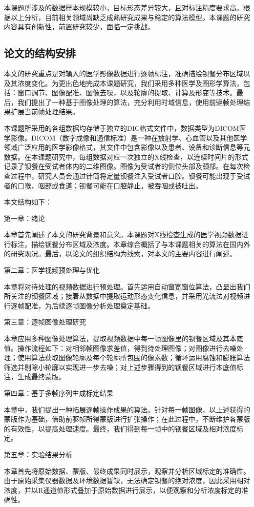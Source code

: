 本课题所涉及的数据样本规模较小，目标形态差异较大，且对标注精度要求高。根据以上分析，目前相关领域尚缺乏成熟研究成果与稳定的算法模型。本课题的研究内容具有创新性，前置研究较少，面临一定挑战。

\subsection{论文的结构安排}

本文的研究重点是对输入的医学影像数据进行逐帧标注，准确描绘钡餐分布区域以及其浓度变化。为更出色地完成本课题研究，我们采用多种医学及图形学算法，包括：窗口调节、图像配准、图像去噪，以及轮廓的提取、计算及形变等技术。最后，我们提出了一种基于图像处理的算法，充分利用时域信息，使用前驱帧处理结果扩展当前帧处理结果。

本课题所采用的各组数据均存储于独立的DIC格式文件中，数据类型为DICOM医学影像。DICOM（数字成像和通信标准）是一种在放射学、心血管以及其他医学领域广泛应用的医学影像格式，其文件中包含影像以及患者、设备和诊断信息等元数据。在本课题研究中，每组数据对应一次独立的X线检查，以连续时间片的形式记录了钡餐在受试者体内的二维图像。图像为受试者的侧位头部及颈部。在每次检查过程中，研究人员会通过针筒将定量钡餐注入受试者口腔。钡餐可能出现于受试者的口喉、咽部或食道；钡餐可能在口腔静止，被吞咽或被吐出。

本文结构如下：

第一章：绪论

本章首先阐述了本文的研究背景和意义。本课题对X线检查生成的医学视频数据进行标注，描绘钡餐分布区域及浓度。本章综合概括了与本课题相关的算法在国内外的研究现况。最后，以论文的组织结构为线索，对本文的主要内容进行阐述。

第二章：医学视频预处理与优化

本章将对待处理的视频数据进行预处理。首先运用自动窗宽窗位算法，凸显出我们所关注的钡餐区域；接着从数据中提取运动形态变化信息，并采用光流法对视频进行逐帧配准，为后续逐帧图像分析处理奠定基础。

第三章：逐帧图像处理研究

本章应用多种图像处理算法，提取视频数据中每一帧图像里的钡餐区域及其本底值。操作流程如下：对相邻帧图像求差值，得到待处理图像；对图像进行去噪处理；使用算法获取图像轮廓及每个轮廓所包围的像素数；循环运用腐蚀和膨胀算法筛选并剔除小轮廓以实现进一步去噪；对上述步骤得到的钡餐区域进行本底值标注，生成最终蒙版。

第四章：基于多帧序列生成标定结果

本章中，我们提出一种拓展逐帧操作成果的算法。针对每一帧图像，以上述获得的蒙版作为基础，借助前驱帧所得蒙版进行扩张操作；在此过程中，不断维护各蒙版的有效性，以提高处理速度。最终，我们得到每一帧中的钡餐区域及相对浓度标定。

第五章：实验结果分析

本章首先将原始数据、蒙版、最终成果同时展示，观察并分析区域标定的准确性。由于原始采集仪器数据及环境数据暂缺，无法确定钡餐的绝对浓度，因此采用相对浓度，并以R通道值形式叠加于原始数据进行展示，以便观察和分析浓度标定的准确性。